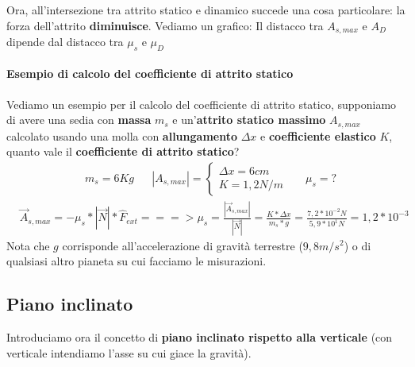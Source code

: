             Ora, all'intersezione tra attrito statico e dinamico succede una cosa particolare: la forza dell'attrito \textbf{diminuisce}. Vediamo un grafico:
            Il distacco tra $A_{s, max}$ e $A_D$ dipende dal distacco tra $\mu_s$ e $\mu_D$

            \paragraph{Esempio di calcolo del coefficiente di attrito statico}
                Vediamo un esempio per il calcolo del coefficiente di attrito statico, supponiamo di avere una sedia con \textbf{massa} $m_s$ e un'\textbf{attrito statico massimo} $A_{s,max}$ calcolato usando una molla con \textbf{allungamento} $\Delta x$ e \textbf{coefficiente elastico} $K$, quanto vale il \textbf{coefficiente di attrito statico}?
                \begin{align*}
                    &m_s=6Kg && |A_{s, max}|=
                    \begin{cases}
                        \Delta x = 6 cm\\
                        K = 1,2 N/m
                    \end{cases}
                    &&\mu_s = ?
                \end{align*}
                \begin{align*}
                    &\vec{A}_{s,max} = -\mu_s * |\vec{N}| * \hat{F}_{ext} ===> \mu_s = \frac{|\vec{A}_{s, max}|}{|\vec{N}|} = \frac{K*\Delta x}{m_s * g} = \frac{7,2*10^{-2}N}{5,9*10^1N}=1,2*10^{-3}
                \end{align*}
                Nota che $g$ corrisponde all'accelerazione di gravità terrestre ($9,8 m/s^2$) o di qualsiasi altro pianeta su cui facciamo le misurazioni.

    \subsection{Piano inclinato}
        Introduciamo ora il concetto di \textbf{piano inclinato rispetto alla verticale} (con verticale intendiamo l'asse su cui giace la gravità).

